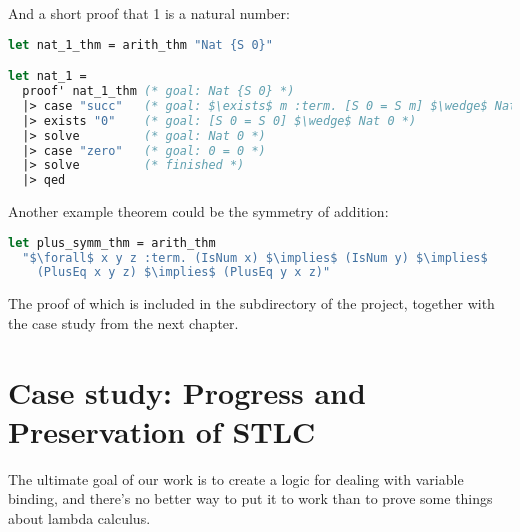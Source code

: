 \documentclass[english, mgr]{iithesis}
\newcommand{\lstt}[1]{\text{{\lstinline[columns=fixed,mathescape]|#1|}}}
\begin{document}
And a short proof that 1 is a natural number:
\begin{lstlisting}[mathescape, language=OCaml, escapebegin=\color{codegreen}]
let nat_1_thm = arith_thm "Nat {S 0}"

let nat_1 =
  proof' nat_1_thm (* goal: Nat {S 0} *)
  |> case "succ"   (* goal: $\exists$ m :term. [S 0 = S m] $\wedge$ Nat m *)
  |> exists "0"    (* goal: [S 0 = S 0] $\wedge$ Nat 0 *)
  |> solve         (* goal: Nat 0 *)
  |> case "zero"   (* goal: 0 = 0 *)
  |> solve         (* finished *)
  |> qed
\end{lstlisting}
Another example theorem could be the symmetry of addition:
\begin{lstlisting}[mathescape, language=OCaml, escapebegin=\color{codepurple}]
let plus_symm_thm = arith_thm
  "$\forall$ x y z :term. (IsNum x) $\implies$ (IsNum y) $\implies$
    (PlusEq x y z) $\implies$ (PlusEq y x z)"
\end{lstlisting}
The proof of which is included in the \lstt{examples} subdirectory of the project,
together with the case study from the next chapter.
\chapter{Case study: Progress and Preservation of STLC}

The ultimate goal of our work is to create a logic for dealing with variable binding,
and there's no better way to put it to work than to prove some things about lambda calculus.
\end{document}
